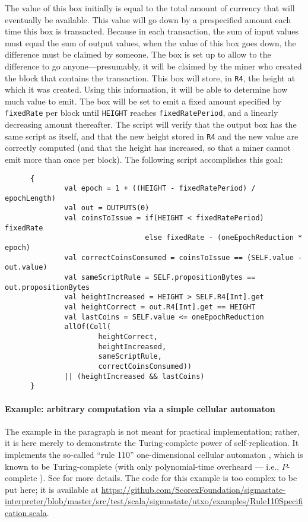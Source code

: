 \documentclass[11pt]{article}
\begin{document}
The value of this box initially is equal to the total amount of currency that will eventually be available. This value will go down by a prespecified amount each time this box is transacted. Because in each transaction, the sum of input values must equal the sum of output values, when the value of this box goes down, the difference must be claimed by someone. The box is set up to allow to the difference to go anyone---presumably, it will be claimed by the miner who created the block that contains the transaction. This box will store, in \texttt{R4}, the height at which it was created. Using this information, it will be able to determine how much value to emit. The box will be set to emit 
a fixed amount specified by \texttt{fixedRate} per block until \texttt{HEIGHT} reaches \texttt{fixedRatePeriod}, and a linearly decreasing amount thereafter. The script will verify that the output box has the same script as itself, and that the new height stored in \texttt{R4} and the new value are correctly computed (and that the height has increased, so that a miner cannot emit more than once per block). The following script accomplishes this goal:
\begin{verbatim}
      {
              val epoch = 1 + ((HEIGHT - fixedRatePeriod) / epochLength)
              val out = OUTPUTS(0)
              val coinsToIssue = if(HEIGHT < fixedRatePeriod) fixedRate 
                                 else fixedRate - (oneEpochReduction * epoch)
              val correctCoinsConsumed = coinsToIssue == (SELF.value - out.value)
              val sameScriptRule = SELF.propositionBytes == out.propositionBytes
              val heightIncreased = HEIGHT > SELF.R4[Int].get
              val heightCorrect = out.R4[Int].get == HEIGHT
              val lastCoins = SELF.value <= oneEpochReduction
              allOf(Coll(
                      heightCorrect, 
                      heightIncreased, 
                      sameScriptRule,
                      correctCoinsConsumed))
              || (heightIncreased && lastCoins)
      }
\end{verbatim}


\paragraph{Example: arbitrary computation via a simple cellular automaton}
The example in the paragraph is not meant for practical implementation; rather, it is here merely to demonstrate the Turing-complete power of self-replication. It implements the so-called ``rule 110'' one-dimensional cellular automaton \cite{wolfram1986theory}, which is known to be Turing-complete \cite{cook2004universality} (with only polynomial-time overheard --- i.e., $P$-complete \cite{NW06}). See \cite{CKM18}  for more details. The code for this example is too complex to be put here; it is available at
\url{https://github.com/ScorexFoundation/sigmastate-interpreter/blob/master/src/test/scala/sigmastate/utxo/examples/Rule110Specification.scala}.
\end{document}
